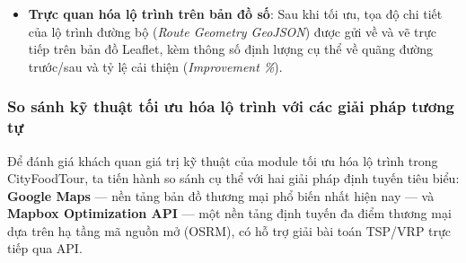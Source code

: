\begin{itemize}[label=\textbullet]
    \item \textbf{Trực quan hóa lộ trình trên bản đồ số}: Sau khi tối ưu, tọa độ chi tiết của lộ trình đường bộ (\textit{Route Geometry GeoJSON}) được gửi về và vẽ trực tiếp trên bản đồ Leaflet, kèm thông số định lượng cụ thể về quãng đường trước/sau và tỷ lệ cải thiện (\textit{Improvement \%}).
\end{itemize}

\subsubsection{So sánh kỹ thuật tối ưu hóa lộ trình với các giải pháp tương tự}
Để đánh giá khách quan giá trị kỹ thuật của module tối ưu hóa lộ trình trong CityFoodTour,
ta tiến hành so sánh cụ thể với hai giải pháp định tuyến tiêu biểu: \textbf{Google Maps} —
nền tảng bản đồ thương mại phổ biến nhất hiện nay — và \textbf{Mapbox Optimization API} —
một nền tảng định tuyến đa điểm thương mại dựa trên hạ tầng mã nguồn mở (OSRM),
có hỗ trợ giải bài toán TSP/VRP trực tiếp qua API.


